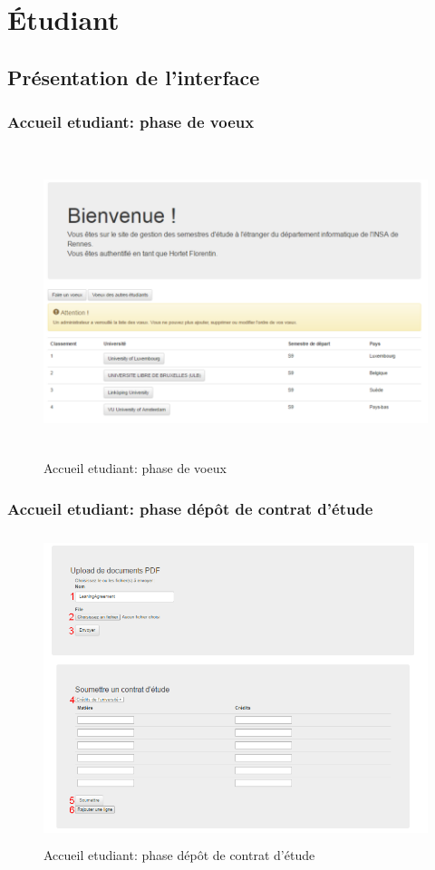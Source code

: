 \chapter{Étudiant}

\section{Présentation de l'interface}

  \subsection{Accueil etudiant: phase de voeux}
  \begin{figure}[H]
  	\centering
  	
  	\includegraphics[width=16cm,height=9cm]{Images/Etudiant/faire_voeux_etud.png}
  	\caption{Accueil etudiant: phase de voeux}
  	\label{pv}
  \end{figure}


  \subsection{Accueil etudiant: phase dépôt de contrat d'étude}
  \begin{figure}[H]
  	\centering
  	
  	\includegraphics[width=16cm,height=9cm]{Images/Etudiant/learning_etud.png}
  	\caption{Accueil etudiant: phase dépôt de contrat d'étude}
  	\label{pl}
  \end{figure}


